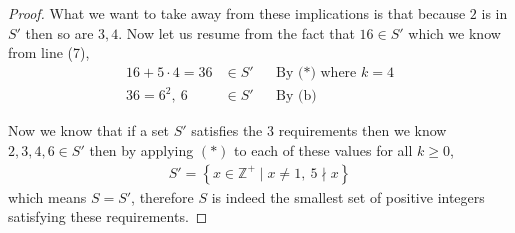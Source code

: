 \documentclass[11pt]{article}
\newcommand{\zz}{\mathbb Z}   %
\newcommand{\set}[1]{\left\{#1\right\}} %
\renewcommand{\geq}{\geqslant}
\begin{document}
\begin{proof}
    What we want to take away from these implications is that because $2$ is in $S'$ then so are $3,4$. Now let us resume from the fact that $16 \in S'$ which we know from line (7),
    \begin{align}
        16 + 5 \cdot 4 = 36 &\in S' && \text{By (*) where $k = 4$} \\
        36 = 6^{2}, \ 6 &\in S' && \text{By (b)}
    \end{align}

    Now we know that if a set $S'$ satisfies the 3 requirements then we know $2,3,4,6 \in S'$ then by applying $(*)$ to each of these values for all $k\geq 0$,
    \begin{align*}
        S' = \set{x \in \zz^{+}\mid x \neq 1, \ 5 \nmid x}
    \end{align*}
    which means $S = S'$, therefore $S$ is indeed the smallest set of positive integers satisfying these requirements.
\end{proof}
\end{document}
